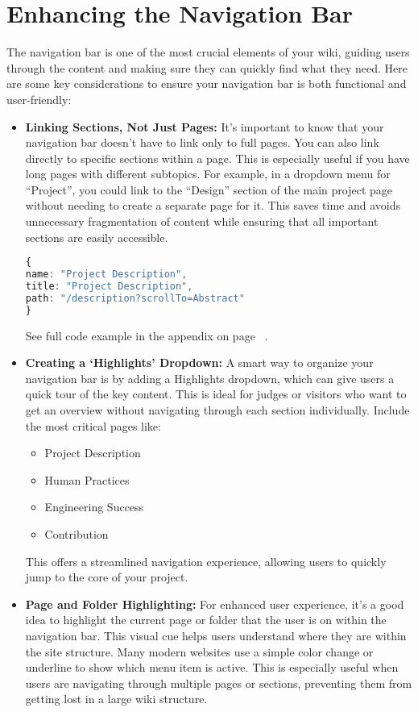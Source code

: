 \section{Enhancing the Navigation Bar} 
The navigation bar is one of the most crucial elements of your wiki, guiding users through the content and making sure they can quickly find what they need.
Here are some key considerations to ensure your navigation bar is both functional and user-friendly:
\begin{itemize}
\item \textbf{Linking Sections, Not Just Pages:}
It’s important to know that your navigation bar doesn’t have to link only to full pages.
You can also link directly to specific sections within a page.
This is especially useful if you have long pages with different subtopics.
For example, in a dropdown menu for ``Project'', you could link to the ``Design'' section of the main project page without needing to create a separate page for it.
This saves time and avoids unnecessary fragmentation of content while ensuring that all important sections are easily accessible.
\begin{mybox}
    \begin{lstlisting}[language=TypeScript]
{
name: "Project Description",
title: "Project Description",
path: "/description?scrollTo=Abstract"
}
    \end{lstlisting}
\end{mybox}
See full code example in the appendix on page \ \pageref{lis:pagests}.
\item \textbf{Creating a ‘Highlights’ Dropdown:}
A smart way to organize your navigation bar is by adding a Highlights dropdown, which can give users a quick tour of the key content.
This is ideal for judges or visitors who want to get an overview without navigating through each section individually.
Include the most critical pages like:
\begin{itemize}
    \item Project Description
    \item Human Practices
    \item Engineering Success
    \item Contribution
\end{itemize}
This offers a streamlined navigation experience, allowing users to quickly jump to the core of your project.

\item \textbf{Page and Folder Highlighting:}
For enhanced user experience, it’s a good idea to highlight the current page or folder that the user is on within the navigation bar.
This visual cue helps users understand where they are within the site structure.
Many modern websites use a simple color change or underline to show which menu item is active.
This is especially useful when users are navigating through multiple pages or sections, preventing them from getting lost in a large wiki structure.


\end{itemize}
